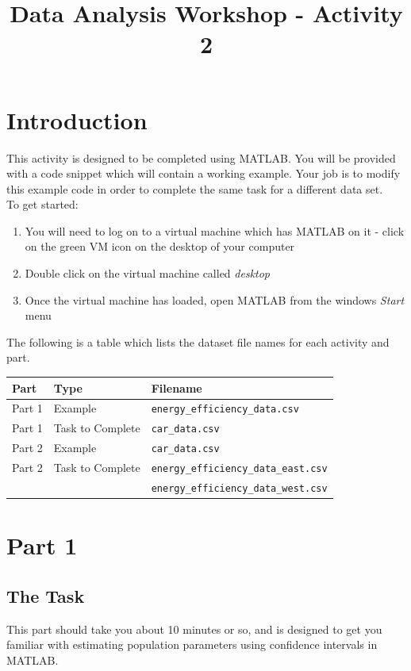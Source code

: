 \documentclass[12pt]{article}
\begin{document}
 
\title{Data Analysis Workshop - Activity 2}
\author{}
\date{}
\maketitle

\section*{Introduction}
This activity is designed to be completed using MATLAB. You will be provided with a code snippet which will contain a working example. Your job is to modify this example code in order to complete the same task for a different data set.\\

To get started:
\begin{enumerate}
\item You will need to log on to a virtual machine which has MATLAB on it - click on the green VM icon on the desktop of your computer
\item Double click on the virtual machine called \textit{desktop}
\item Once the virtual machine has loaded, open MATLAB from the windows \textit{Start} menu
\end{enumerate}
\vspace{0.5cm}
The following is a table which lists the dataset file names for each activity and part.
\begin{table}[h]
\centering
\begin{tabular}{l l l}
\toprule
\textbf{Part} & \textbf{Type} & \textbf{Filename}\\
\midrule
Part 1 & Example & \verb|energy_efficiency_data.csv|\\
Part 1 & Task to Complete & \verb|car_data.csv|\\
Part 2 & Example & \verb|car_data.csv|\\
Part 2 & Task to Complete & \verb|energy_efficiency_data_east.csv|\\
 & &  \verb|energy_efficiency_data_west.csv|\\
\bottomrule
\end{tabular}
\end{table}

\section*{Part 1}
\subsection*{The Task}
This part should take you about 10 minutes or so, and is designed to get you familiar with estimating population parameters using confidence intervals in MATLAB.\\
\end{document}
